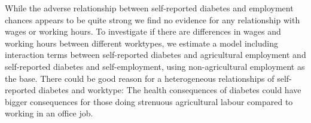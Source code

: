 While the adverse relationship between self-reported diabetes and
employment chances appears to be quite strong we find no evidence
for any relationship with wages or working hours. To investigate if
there are differences in wages and working hours between different
worktypes, we estimate a model including interaction terms between
self-reported diabetes and agricultural employment and self-reported
diabetes and self-employment, using non-agricultural employment as
the base. There could be good reason for a heterogeneous relationships
of self-reported diabetes and worktype: The health consequences of
diabetes could have bigger consequences for those doing strenuous
agricultural labour compared to working in an office job.   
  
  
  
  
  